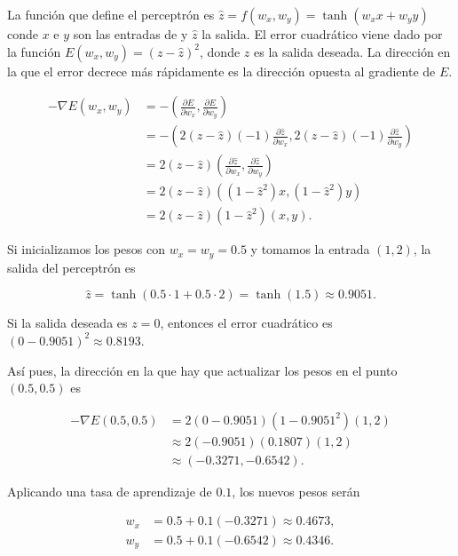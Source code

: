 \documentclass[
  spanish,
  a4paper,
]{scrreport}
\theoremstyle{definition}
\theoremstyle{remark}
\begin{document}
\begin{tcolorbox}[enhanced jigsaw, arc=.35mm, bottomrule=.15mm, bottomtitle=1mm, breakable, colback=white, colbacktitle=quarto-callout-tip-color!10!white, colframe=quarto-callout-tip-color-frame, coltitle=black, left=2mm, leftrule=.75mm, opacityback=0, opacitybacktitle=0.6, rightrule=.15mm, title=\textcolor{quarto-callout-tip-color}{\faLightbulb}\hspace{0.5em}{Solución}, titlerule=0mm, toprule=.15mm, toptitle=1mm]

La función que define el perceptrón es
\(\hat z = f(w_x, w_y) = \tanh(w_x x + w_y y)\) conde \(x\) e \(y\) son
las entradas de y \(\hat z\) la salida. El error cuadrático viene dado
por la función \(E(w_x, w_y) = (z - \hat z)^2\), donde \(z\) es la
salida deseada. La dirección en la que el error decrece más rápidamente
es la dirección opuesta al gradiente de \(E\).

\begin{align*}
-\nabla E(w_x, w_y) 
&= -\left( \frac{\partial E}{\partial w_x}, \frac{\partial E}{\partial w_y} \right) \\
&= -\left( 2(z - \hat z)(-1) \frac{\partial \hat z}{\partial w_x}, 2(z - \hat z)(-1) \frac{\partial \hat z}{\partial w_y} \right) \\
&= 2(z - \hat z) \left( \frac{\partial \hat z}{\partial w_x}, \frac{\partial \hat z}{\partial w_y} \right) \\
&= 2(z - \hat z) \left( (1 - \hat z^2) x, (1 - \hat z^2) y \right) \tag{derivada de $\tanh$} \\
&= 2(z - \hat z)(1 - \hat z^2) (x, y).
\end{align*}

Si inicializamos los pesos con \(w_x = w_y = 0.5\) y tomamos la entrada
\((1,2)\), la salida del perceptrón es

\[
\hat z = \tanh(0.5 \cdot 1 + 0.5 \cdot 2) = \tanh(1.5) \approx 0.9051.
\]

Si la salida deseada es \(z=0\), entonces el error cuadrático es
\((0-0.9051)^2 \approx 0.8193\).

Así pues, la dirección en la que hay que actualizar los pesos en el
punto \((0.5, 0.5)\) es

\begin{align*}
-\nabla E(0.5, 0.5)
&= 2(0 - 0.9051)(1 - 0.9051^2)(1, 2) \\
&\approx 2(-0.9051)(0.1807)(1, 2) \\
&\approx (-0.3271, -0.6542).
\end{align*}

Aplicando una tasa de aprendizaje de \(0.1\), los nuevos pesos serán

\begin{align*}
w_x &= 0.5 + 0.1 (-0.3271) \approx 0.4673, \\
w_y &= 0.5 + 0.1 (-0.6542) \approx 0.4346.
\end{align*}

\end{tcolorbox}
\end{document}

